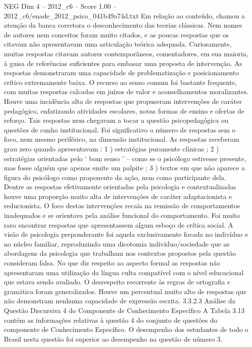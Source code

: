 \begin{textsample}{NEG Dim 4 – 2012\_c6 – Score 1.00 – 2012\_c6/enade\_2012\_psico\_041b49a74d.txt}
Em relação ao conteúdo, chamou a atenção da banca corretora o desconhecimento das teorias clássicas.
Nem nomes de autores nem conceitos foram muito citados, e as poucas respostas que os citavam não apresentavam uma articulação teórica adequada.
Curiosamente, muitas respostas citavam autores contemporâneos, comentadores, em sua maioria, à guisa de referências suficientes para embasar uma proposta de intervenção.
As respostas demonstraram uma capacidade de problematização e posicionamento crítico extremamente baixa.
O recurso ao senso comum foi bastante frequente, com muitas respostas calcadas em juízos de valor e aconselhamentos moralizantes.
Houve uma incidência alta de respostas que propuseram intervenções de caráter pedagógico, enfatizando atividades escolares, novas formas de ensino e ofertas de reforço.
Tais respostas nem chegavam a tocar a questão psicopedagógica ou questões de cunho institucional.
Foi significativo o número de respostas sem o foco, nem mesmo periférico, na dimensão institucional.
As respostas receberam grau zero quando apresentavam : 1 ) estratégias puramente clínicas ; 2 ) estratégias orientadas pelo ‘ bom senso ’ – como se o psicólogo estivesse presente, mas fosse alguém que apenas emite um palpite ; 3 ) textos em que não aparece a figura do psicólogo como proponente da ação, nem como participante dela.
Dentre as respostas efetivamente orientadas pela psicologia e contextualizadas houve uma proporção muito alta de intervenções de caráter adaptacionista e reducionista.
O foco destas intervenções recaía na remissão de comportamentos inadequados e se orientava pela análise funcional do comportamento.
Foi muito raro encontrar respostas que apresentassem algum esboço de crítica social.
A visão de psicologia preponderante foi aquela exclusivamente focada no indivíduo e no núcleo familiar, reproduzindo uma dicotomia indivíduo/sociedade que as abordagens da psicologia que trabalham nos contextos propostos pela questão consideram falsa.
No que diz respeito ao aspecto formal as respostas não apresentaram uma utilização da língua culta compatível com o nível educacional que estava sendo avaliado.
O desrespeito recorrente às regras de ortografia e gramática foram generalizados.
Houve um percentual muito alto de respostas que não demonstram nenhuma capacidade de expressão escrita. 3.3.2.3 Análise da Questão Discursiva 4 do Componente de Conhecimento Específico A Tabela 3.13 contém as informações relativas à questão 4 do conjunto de questões do componente de Conhecimento Específico.
O desempenho dos estudantes de todo o Brasil nesta questão foi superior ao desempenho na questão de número 3.

\end{textsample}
